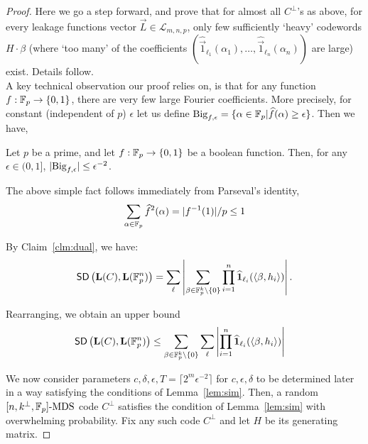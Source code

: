 \begin{proof}
Here we go a step forward, and prove that for almost all $C^\bot$'s as above, for every leakage functions vector $\vec{L} \in {\mathcal{L}}_{m,n,p}$, only few sufficiently `heavy' codewords $H\cdot \beta$ (where `too many' of the coefficients $(\widehat{\vec{1}}_{\ell_1}(\alpha_1),\ldots,\widehat{\vec{1}}_{\ell_n}(\alpha_n))$ are large) exist. Details follow.\\


A key technical observation our proof relies on, is that for any function $f:\mathbb{F}_p\rightarrow \{0,1\}$, there are very few large Fourier coefficients.
More precisely, for constant (independent of $p$) $\epsilon$ let us define $\textnormal{Big}_{f,\epsilon}=\{\alpha\in\mathbb{F}_p|\widehat{f}(\alpha) \geq \epsilon\}$. Then we have,

\begin{claim}\label{clm:heavy}
Let $p$ be a prime, and let $f:\mathbb{F}_p\rightarrow\{0,1\}$ be a boolean function.
Then, for any $\epsilon\in(0,1]$, $| \textnormal{Big}_{f,\epsilon}|\leq\epsilon^{-2}$. 
\end{claim} 

\noindent The above simple fact follows immediately from Parseval's identity,
$$\sum_{\alpha\in\mathbb{F}_p}{\widehat{f}}^2(\alpha)=|f^{-1}(1)|/p\leq 1$$


\noindent By Claim~\ref{clm:dual}, we have:
\begin{align}
\mathsf{SD} \left({\mathbf{L}(C)},{\mathbf{L}(\mathbb{F}^n_p)} \right)=\sum_{\mathbf{\ell}}\left|\sum_{\beta\in 
\mathbb{F}^{k}_p\setminus{\{0\}}}\prod^n_{i=1}\widehat{\mathbf{1}}_{\ell_i}(\langle\beta,h_i\rangle)\right|.
\end{align}



\noindent Rearranging, we obtain an upper bound
\begin{align}
&\mathsf{SD} \left({\mathbf{L}(C)},{\mathbf{L}(\mathbb{F}^n_p)} \right)\leq \sum_{\beta\in 
\mathbb{F}^{k}_p\setminus{\{0\}}}\sum_{\mathbf{\ell}}\left|\prod^n_{i=1}\widehat{\mathbf{1}}_{\ell_i}(\langle\beta,h_i\rangle)\right|\label{eq:8}
\end{align}

We now consider parameters $c,\delta,\epsilon,T=\lceil 2^m\epsilon^{-2}\rceil$ for $c,\epsilon,\delta$ to be determined later in a way satisfying the conditions of Lemma~\ref{lem:sim}.
Then, a random $[n,k^\bot,\mathbb{F}_p]\text{-MDS}$ code $C^\bot$ satisfies the condition of Lemma~\ref{lem:sim} with overwhelming probability. Fix any such code $C^\bot$ and let $H$ be its generating matrix.


\end{proof}
